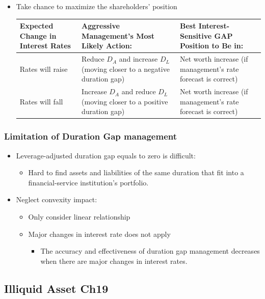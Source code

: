 \begin{itemize}
\item Take chance to maximize the shareholders' position

\begin{tabular}{|p{2.8cm}|p{7cm}|p{7cm}|}
    \hline
    Expected Change in Interest Rates & Aggressive Management's Most Likely Action: & Best Interest-Sensitive GAP Position to Be in: \\
    \hline
    Rates will raise & Reduce \(D_A\) and increase \(D_L\) (moving closer to a negative duration gap) & Net worth increase (if management's rate forecast is correct) \\
    \hline
    Rates will fall & Increase \(D_A\) and reduce \(D_L\) (moving closer to a positive duration gap) & Net worth increase (if management's rate forecast is correct) \\
    \hline
    \end{tabular}
    
\end{itemize}



\subsubsection{Limitation of Duration Gap management}
\begin{itemize}
\item Leverage-adjusted duration gap equals to zero is difficult:
    \begin{itemize}
    \item Hard to find assets and liabilities of the same duration that fit into a financial-service institution's portfolio.
    \end{itemize}
\item Neglect convexity impact:
    \begin{itemize}
    \item Only consider linear relationship
    \item Major changes in interest rate does not apply
        \begin{itemize}
        \item The accuracy and effectiveness of duration gap management decreases when there are major changes in interest rates.
        \end{itemize}
    \end{itemize}
\end{itemize}



\subsection{Illiquid Asset Ch19}



